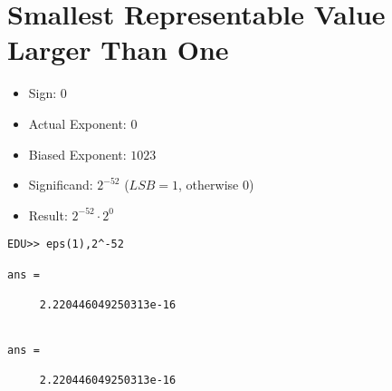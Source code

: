 \documentclass[a4paper,10pt]{article}
\begin{document}
\section{Smallest Representable Value Larger Than One}
\begin{itemize}
    \item Sign: $0$
    \item Actual Exponent: $0$
    \item Biased Exponent: $1023$
    \item Significand: $2^{-52}$ ($LSB = 1$, otherwise $0$)
    \item Result: $2^{-52} \cdot 2^{0}$
\end{itemize}
\begin{verbatim}
EDU>> eps(1),2^-52

ans =

     2.220446049250313e-16


ans =

     2.220446049250313e-16
\end{verbatim}
\end{document}
